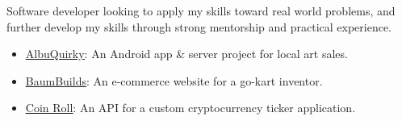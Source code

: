 \smallskip

\raggedright
{}
  Software developer looking to apply my skills toward real world problems, and further develop my skills through strong mentorship and practical experience.

  \medskip


\raggedright
{}
  \centering

  \divider
  
  \divider


  \medskip


\raggedright
{}
  \centering

  \divider


  \medskip


\raggedright
{}
  \begin{itemize}
    \item \href{https://albuquirky.github.io/}{\underline{AlbuQuirky}}: An Android app \& server project for local art sales.
    \item \href{https://baumbuilds.com}{\underline{BaumBuilds}}: An e-commerce website for a go-kart inventor.
    \item \href{https://github.com/AugmenTab/coinroll-python}{\underline{Coin Roll}}: An API for a custom cryptocurrency ticker application.
  \end{itemize}
